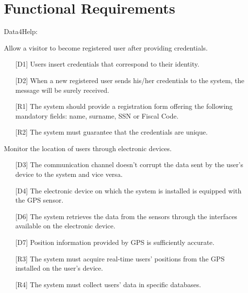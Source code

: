 \section{Functional Requirements}
Data4Help:  
\begin{enumerate} [label={[G\arabic*]}]
    \item Allow a visitor to become registered user after providing credentials.
        \begin{itemize}
            \item [{[D1]}] Users insert credentials that correspond to their identity.
            \item [{[D2]}] When a new registered user sends his/her credentials to the system, the message will be surely received.
            \item [{[R1]}] The system should provide a registration form offering the following mandatory fields: name, surname, SSN or Fiscal Code.
            \item [{[R2]}] The system must guarantee that the credentials are unique.
        \end{itemize}
        
    \item Monitor the location of users through electronic devices.
        \begin{itemize}
            \item [{[D3]}] The communication channel doesn't corrupt the data sent by the user's device to the system and vice versa.
            \item [{[D4]}] The electronic device on which the system is installed is equipped with the GPS sensor.
            \item [{[D6]}] The  system  retrieves  the  data  from  the  sensors through the interfaces available on the electronic device.
            \item [{[D7]}] Position information provided by GPS is sufficiently accurate.
            \item [{[R3]}] The system must acquire real-time users' positions from the GPS installed on the user's device.
            \item [{[R4]}] The system must collect users' data in specific databases.
        \end{itemize}
        

\end{enumerate}
